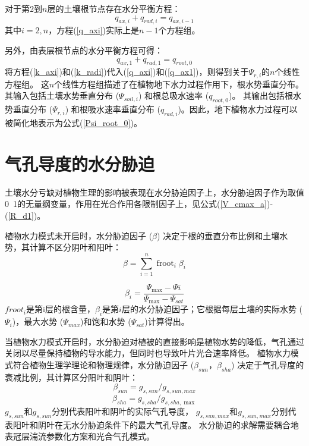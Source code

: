 对于第2到$n$层的土壤根节点存在水分平衡方程：
\begin{equation}\label{q_axi}
q_{a x, i}+q_{r a d, i}=q_{a x, i-1}
\end{equation}
其中$i=2, n$，方程(\ref{q_axi})实际上是$n-1$个方程组。


另外，由表层根节点的水分平衡方程可得：
\begin{equation}\label{q_ax1}
q_{ax,1}+q_{rad, 1}=q_{root,0}
\end{equation}
将方程(\ref{k_axi})和(\ref{k_radi})代入(\ref{q_axi})和(\ref{q_ax1})，则得到关于$ \Psi_{r,i}$的$n$个线性方程组。
这$n$个线性方程组描述了在植物地下水力过程作用下，根水势垂直分布。其输入包括土壤水势垂直分布 ($\Psi_{soil,i}$) 和根总吸水速率 ($q_{root,0}$)。
其输出包括根水势垂直分布 ($\Psi_{r,i}$) 和根吸水速率垂直分布 ($q_{rad,i}$)。因此，地下植物水力过程可以被简化地表示为公式(\ref{Psi_root_0})。

\section{气孔导度的水分胁迫}\label{气孔导度的水分胁迫}
土壤水分亏缺对植物生理的影响被表现在水分胁迫因子上，水分胁迫因子作为取值0~1的无量纲变量，作用在光合作用各限制因子上，见公式(\ref{V_cmax_a})-(\ref{R_d1})。

植物水力模式未开启时，水分胁迫因子 ($\beta$) 决定于根的垂直分布比例和土壤水势，其计算不区分阴叶和阳叶：
\begin{equation}\label{beta_0}
\beta=\sum_{i=1}^{n} \operatorname{froot}_{i} \beta_{i}
\end{equation}

\begin{equation}\label{beta_i}
\beta_{i}=\frac{\Psi_{\max }-\Psi i}{\Psi_{\max }-\Psi_{s a t}}
\end{equation}
$froot_i$是第i层的根含量，$\beta_i$是第$i$层的水分胁迫因子；它根据每层土壤的实际水势 (${\Psi}_i$)，最大水势 (${\Psi}_{max}$)和饱和水势 (${\Psi}_{sat}$)计算得出。

当植物水力模式开启时，水分胁迫对植被的直接影响是植物水势的降低，气孔通过关闭以尽量保持植物的导水能力，但同时也导致叶片光合速率降低。
植物水力模式符合植物生理学理论和物理规律，水分胁迫因子 ($\beta_{sun}$，$\beta_{sha}$) 决定于气孔导度的衰减比例，其计算区分阳叶和阴叶：
\begin{equation}\label{beta_sun}
\beta_{sun}=g_{s,sun} / g_{s,sun,max }
\end{equation}
\begin{equation}\label{beta_sha}
\beta_{sha}=g_{s,sha} / g_{s,sha, \max }
\end{equation}
$g_{s,sun}$和$g_{s,sun}$分别代表阳叶和阴叶的实际气孔导度，
$g_{s,sun,max}$和$g_{s,sun,max}$分别代表阳叶和阴叶在无水分胁迫条件下的最大气孔导度。
水分胁迫的求解需要耦合地表冠层湍流参数化方案和光合气孔模式。


